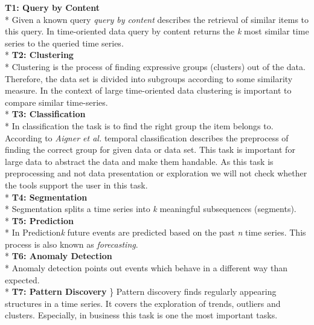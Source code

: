 \textbf{T1: Query by Content}
\\*
Given a known query \textit{query by content} describes the retrieval of similar items to this query. In time-oriented data query by content returns the \textit{k} most similar time series to the queried time series.
\\*
\textbf{T2: Clustering}\\*
Clustering is the process of finding expressive groups (clusters) out of the data. Therefore, the data set is divided into subgroups according to some similarity measure. In the context of large time-oriented data clustering is important to compare similar time-series.
\\*
\textbf{T3: Classification}\\*
In classification the task is to find the right group the item belongs to. According to \textit{Aigner et al.} temporal classification describes the preprocess of finding the correct group for given data or data set. This task is important for large data to abstract the data and make them handable. As this task is preprocessing and not data presentation or exploration we will not check whether the tools support the user in this task. 
\\*
\textbf{T4: Segmentation}\\*
Segmentation splits a time series into \textit{k} meaningful subsequences (segments)\cite{batyrshin2007perception}. 
\\*
\textbf{T5: Prediction}\\*
In Prediction\textit{k} future events are predicted based on the past \textit{n} time series. This process is also known as \textit{forecasting}. 
\\*
\textbf{T6: Anomaly Detection} \\*
Anomaly detection points out events which behave in a different way than expected.
\\*
\textbf{T7: Pattern Discovery} \}\*
Pattern discovery finds regularly appearing structures in a time series.  It covers the exploration of trends, outliers and clusters. Especially, in business this task is one the most important tasks.


